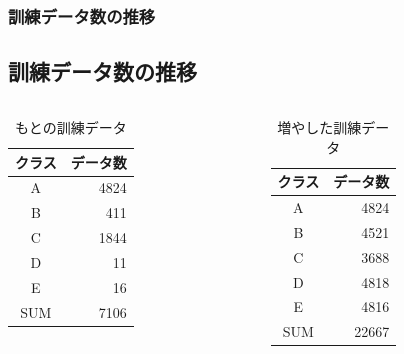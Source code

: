 \documentclass[leno,xcolor=dvipsnames]{beamer}
\begin{document}
  \begin{frame}
    \frametitle{訓練データ数の推移}
    \subsection{訓練データ数の推移}
    \begin{columns}
      \begin{column}{0.48\textwidth}
        \begin{table}[H]
          \centering
          \caption{もとの訓練データ}
          \begin{tabular}{cr}
            \toprule
            クラス & データ数 \\
            \midrule
            A & 4824 \\
            B & 411 \\ 
            C & 1844 \\
            D & 11 \\
            E & 16 \\
            \midrule
            SUM & 7106 \\
            \bottomrule
          \end{tabular}
        \end{table}
      \end{column}
      \begin{column}{0.48\textwidth}
        \begin{table}[H]
          \centering
          \caption{増やした訓練データ}
          \begin{tabular}{cr}
            \toprule
            クラス & データ数 \\
            \midrule
            A & 4824 \\
            B & 4521 \\ 
            C & 3688 \\
            D & 4818 \\
            E & 4816 \\
            \midrule
            SUM & 22667 \\
            \bottomrule
          \end{tabular}
        \end{table}
      \end{column}
    \end{columns}
  \end{frame}
\end{document}
